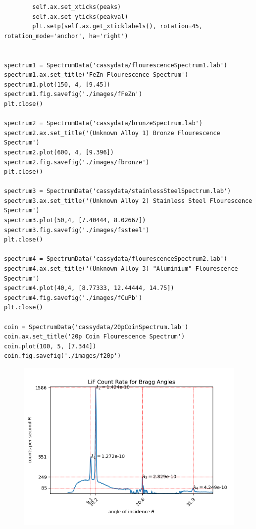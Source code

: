 \documentclass[8pt, a4paper]{article}
\begin{document}
\begin{verbatim}
        self.ax.set_xticks(peaks)
        self.ax.set_yticks(peakval)
        plt.setp(self.ax.get_xticklabels(), rotation=45, rotation_mode='anchor', ha='right')


spectrum1 = SpectrumData('cassydata/flourescenceSpectrum1.lab')
spectrum1.ax.set_title('FeZn Flourescence Spectrum')
spectrum1.plot(150, 4, [9.45])
spectrum1.fig.savefig('./images/fFeZn')
plt.close()

spectrum2 = SpectrumData('cassydata/bronzeSpectrum.lab')
spectrum2.ax.set_title('(Unknown Alloy 1) Bronze Flourescence Spectrum')
spectrum2.plot(600, 4, [9.396])
spectrum2.fig.savefig('./images/fbronze')
plt.close()

spectrum3 = SpectrumData('cassydata/stainlessSteelSpectrum.lab')
spectrum3.ax.set_title('(Unknown Alloy 2) Stainless Steel Flourescence Spectrum')
spectrum3.plot(50,4, [7.40444, 8.02667])
spectrum3.fig.savefig('./images/fssteel')
plt.close()

spectrum4 = SpectrumData('cassydata/flourescenceSpectrum2.lab')
spectrum4.ax.set_title('(Unknown Alloy 3) "Aluminium" Flourescence Spectrum')
spectrum4.plot(40,4, [8.77333, 12.44444, 14.75])
spectrum4.fig.savefig('./images/fCuPb')
plt.close()

coin = SpectrumData('cassydata/20pCoinSpectrum.lab')
coin.ax.set_title('20p Coin Flourescence Spectrum')
coin.plot(100, 5, [7.344])
coin.fig.savefig('./images/f20p')
\end{verbatim}

\begin{figure}[h]
\includegraphics{LiF1}
\end{figure}
\end{document}
